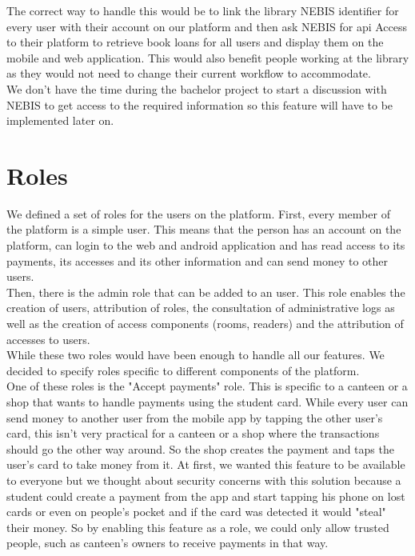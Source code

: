 \documentclass[twoside, openright,11pt,a4paper]{book}
\begin{document}
The correct way to handle this would be to link the library NEBIS identifier for every user with their account on our platform and then ask NEBIS for \gls{api} Access to their platform to retrieve book loans for all users and display them on the mobile and web application. This would also benefit people working at the library as they would not need to change their current workflow to accommodate.\\

We don't have the time during the bachelor project to start a discussion with NEBIS to get access to the required information so this feature will have to be implemented later on.
\section{Roles}
\label{roles_section}
We defined a set of roles for the users on the platform. First, every member of the platform is a simple user. This means that the person has an account on the platform, can login to the web and android application and has read access to its payments, its accesses and its other information and can send money to other users.\\

Then, there is the admin role that can be added to an user. This role enables the creation of users, attribution of roles, the consultation of administrative logs as well as the creation of access components (rooms, readers) and the attribution of accesses to users.\\

While these two roles would have been enough to handle all our features. We decided to specify roles specific to different components of the platform.\\

One of these roles is the "Accept payments" role. This is specific to a canteen or a shop that wants to handle payments using the student card. While every user can send money to another user from the mobile app by tapping the other user's card, this isn't very practical for a canteen or a shop where the transactions should go the other way around. So the shop creates the payment and taps the user's card to take money from it. At first, we wanted this feature to be available to everyone but we thought about security concerns with this solution because a student could create a payment from the app and start tapping his phone on lost cards or even on people's pocket and if the card was detected it would "steal" their money. So by enabling this feature as a role, we could only allow trusted people, such as canteen's owners to receive payments in that way. \\
\end{document}
